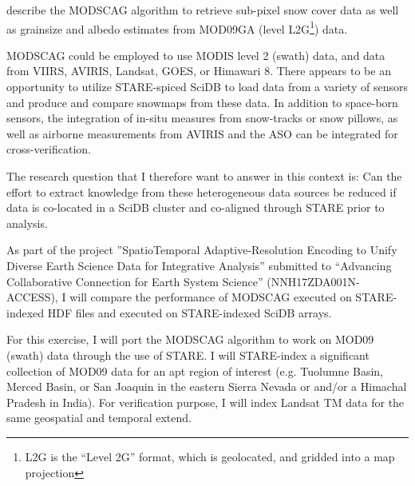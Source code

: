 \documentclass[a4paper,10pt]{article}
\begin{document}
\cite{Painter2009} describe the \gls{MODSCAG} algorithm to retrieve sub-pixel snow cover data as well as grainsize and albedo estimates from MOD09GA (level \gls{L2G}\footnote{L2G is the ``Level 2G'' format, which is geolocated, and gridded into a map projection}) data. 

\gls{MODSCAG} could be employed to use \gls{MODIS} level 2 (swath) data, and data from \gls{VIIRS}, \gls{AVIRIS}, Landsat, \gls{GOES}, or Himawari 8. There appears to be an opportunity to utilize \gls{STARE}-spiced SciDB to load data from a variety of sensors and produce and compare snowmaps from these data. In addition to space-born sensors, the integration of in-situ measures from snow-tracks or snow pillows, as well as airborne measurements from \gls{AVIRIS} and the \gls{ASO} can be integrated for cross-verification.

The research question that I therefore want to answer in this context is: Can the effort to extract knowledge from these heterogeneous data sources be reduced if data is co-located in a SciDB cluster and co-aligned through \gls{STARE} prior to analysis.

As part of the project ''SpatioTemporal Adaptive-Resolution Encoding to Unify Diverse Earth Science Data for Integrative Analysis'' submitted to ``Advancing Collaborative Connection for Earth System Science'' (NNH17ZDA001N-ACCESS), I will compare the performance of \gls{MODSCAG} \citep{Painter2009} executed on \gls{STARE}-indexed \gls{HDF} files and executed on \gls{STARE}-indexed SciDB arrays.

For this exercise, I will port the \gls{MODSCAG} algorithm to work on MOD09 (swath) data through the use of \gls{STARE}. I will \gls{STARE}-index a significant collection of MOD09 data for an apt region of interest (e.g. Tuolumne Basin, Merced Basin, or San Joaquin in the eastern Sierra Nevada or and/or a Himachal Pradesh in India). For verification purpose, I will index Landsat \gls{TM} data for the same geospatial and temporal extend.
\end{document}
